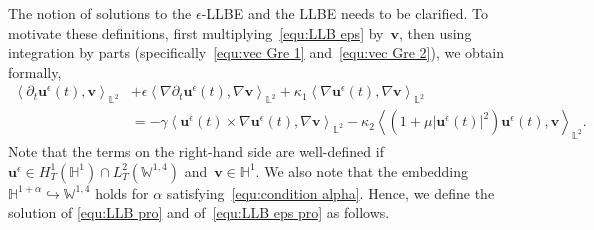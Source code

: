 \documentclass[11pt,reqno]{amsart}
\theoremstyle{definition}
\numberwithin{equation}{section}
\newcommand{\bff}{\boldsymbol}
\newcommand{\bb}{\mathbb}
\newcommand{\nn}{\nonumber}
\newcommand{\inpro}[2]{\left\langle#1,#2\right\rangle}
\begin{document}
The notion of solutions to the $\epsilon$-LLBE and the LLBE needs to be clarified. To motivate these definitions, first multiplying~\eqref{equ:LLB eps} by~$\bff{v}$, then using integration by parts (specifically~\eqref{equ:vec Gre 1} and~\eqref{equ:vec Gre 2}), we obtain formally,
\begin{align*}
	\nonumber
	\inpro{\partial_t \bff{u}^\epsilon(t)}{\bff{v}}_{\bb{L}^2}
	&+
	\epsilon \inpro{\nabla \partial_t \bff{u}^\epsilon(t)}{\nabla\bff{v}}_{\bb{L}^2}
	+
	\kappa_1 \inpro{\nabla\bff{u}^\epsilon(t)}{\nabla\bff{v}}_{\bb{L}^2}
	\nn\\
	&=
	-
	\gamma
	\inpro{\bff{u}^\epsilon(t)\times\nabla\bff{u}^\epsilon(t)}{\nabla\bff{v}}_{\bb{L}^2}
	-
	\kappa_2
	\inpro{(1+\mu|\bff{u}^\epsilon(t)|^2)\bff{u}^\epsilon(t)}{\bff{v}}_{\bb{L}^2}.
\end{align*}
Note that the terms on the right-hand side are well-defined
if~$\bff{u}^\epsilon\in H^1_T(\bb{H}^1)\cap L^2_T(\bb{W}^{1,4})$
and~$\bff{v}\in\bb{H}^1$. We also note that the embedding $\bb{H}^{1+\alpha}\hookrightarrow \bb{W}^{1,4}$ holds for $\alpha$ satisfying~\eqref{equ:condition alpha}. Hence, we define the solution of \eqref{equ:LLB pro}
and of~\eqref{equ:LLB eps pro} as follows. 
\end{document}
